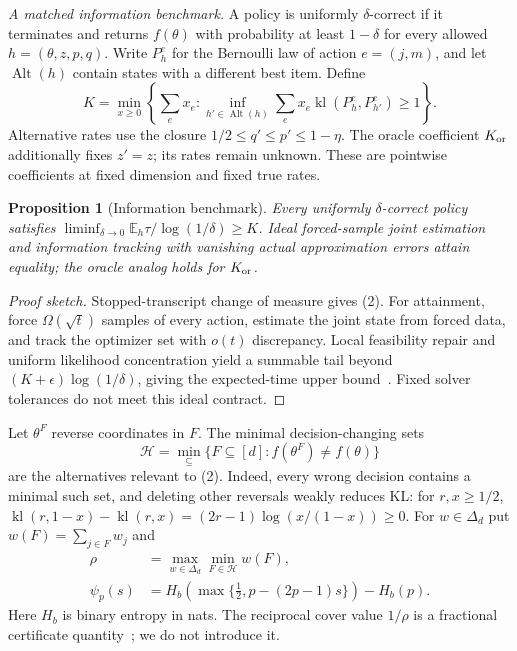 \documentclass[sigconf,anonymous,review]{acmart}
\newtheorem{proposition}[theorem]{Proposition}
\DeclareMathOperator{\kl}{kl}
\DeclareMathOperator{\Alt}{Alt}
\begin{document}
\emph{A matched information benchmark.} A policy is uniformly $\delta$-correct if it terminates and returns $f(\theta)$ with probability at least $1-\delta$ for every allowed $h=(\theta,z,p,q)$. Write $P_h^e$ for the Bernoulli law of action $e=(j,m)$, and let $\Alt(h)$ contain states with a different best item. Define
\begin{equation}K=\min_{x\ge0}\left\{\sum_e x_e:\inf_{h'\in\Alt(h)}\sum_e x_e\kl(P_h^e,P_{h'}^e)\ge1\right\}.\end{equation}
Alternative rates use the closure $1/2\le q'\le p'\le1-\eta$. The oracle coefficient $K_{\rm or}$ additionally fixes $z'=z$; its rates remain unknown. These are pointwise coefficients at fixed dimension and fixed true rates.
\begin{proposition}[Information benchmark]
Every uniformly $\delta$-correct policy satisfies $\liminf_{\delta\to0}\mathbb E_h\tau/\log(1/\delta)\ge K$. Ideal forced-sample joint estimation and information tracking with vanishing actual approximation errors attain equality; the oracle analog holds for $K_{\rm or}$.
\end{proposition}
\begin{proof}[Proof sketch] Stopped-transcript change of measure gives (2). For attainment, force $\Omega(\sqrt t)$ samples of every action, estimate the joint state from forced data, and track the optimizer set with $o(t)$ discrepancy. Local feasibility repair and uniform likelihood concentration yield a summable tail beyond $(K+\epsilon)\log(1/\delta)$, giving the expected-time upper bound~\cite{r3}. Fixed solver tolerances do not meet this ideal contract.\end{proof}
Let $\theta^F$ reverse coordinates in $F$. The minimal decision-changing sets
\begin{equation}\mathcal H=\min_{\subseteq}\{F\subseteq[d]:f(\theta^F)\ne f(\theta)\}\end{equation}
are the alternatives relevant to (2). Indeed, every wrong decision contains a minimal such set, and deleting other reversals weakly reduces KL: for $r,x\ge1/2$, $\kl(r,1-x)-\kl(r,x)=(2r-1)\log(x/(1-x))\ge0$. For $w\in\Delta_d$ put $w(F)=\sum_{j\in F}w_j$ and
\begin{equation}\begin{split}\rho&=\max_{w\in\Delta_d}\min_{F\in\mathcal H}w(F),\\\psi_p(s)&=H_b\!\left(\max\{\tfrac12,p-(2p-1)s\}\right)-H_b(p).\end{split}\end{equation}
Here $H_b$ is binary entropy in nats. The reciprocal cover value $1/\rho$ is a fractional certificate quantity~\cite{r9}; we do not introduce it.
\end{document}
